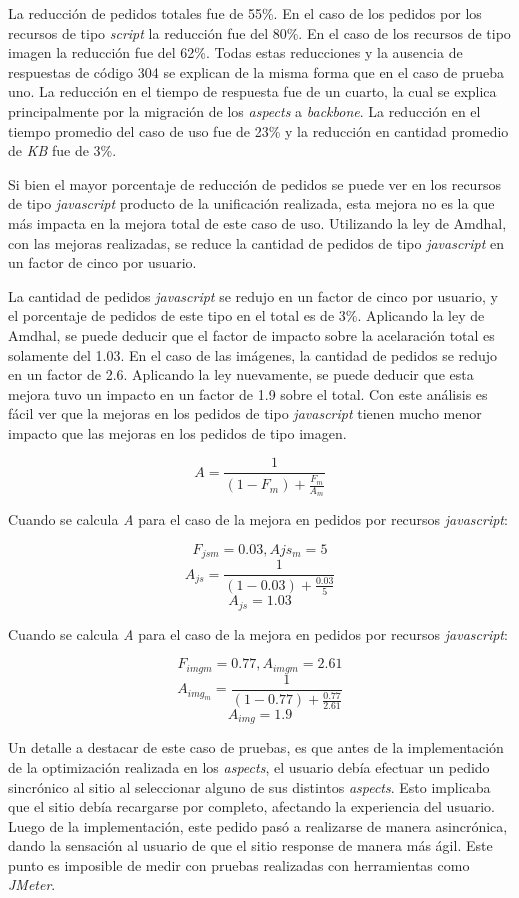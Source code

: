 La reducción de pedidos totales fue de 55\%. En el caso de los pedidos por los recursos de tipo
\emph{script} la reducción fue del 80\%. En el caso de los recursos de tipo imagen la reducción fue del 62\%. Todas estas reducciones
y la ausencia de respuestas de código 304 se explican de la misma forma que en el caso de prueba uno. La reducción en el tiempo de respuesta fue de un cuarto, la cual se explica 
principalmente por la migración de los \emph{aspects} a \emph{backbone}. La reducción en el tiempo promedio del caso de uso fue de 23\% y la reducción en cantidad promedio
de \emph{KB} fue de 3\%.

Si bien el mayor porcentaje de reducción de pedidos se puede ver en los recursos de tipo \emph{javascript} producto de la unificación realizada, esta mejora no es la que más
impacta en la mejora total de este caso de uso. Utilizando la ley de Amdhal, con las mejoras realizadas, se reduce la cantidad de pedidos de tipo \emph{javascript} en un factor
de cinco por usuario. 

La cantidad de pedidos \emph{javascript} se redujo en un factor de cinco por usuario, y el porcentaje de pedidos de este tipo en el total es de 3\%. Aplicando la ley
de Amdhal, se puede deducir que el factor de impacto sobre la acelaración total es solamente del 1.03. En el caso de las imágenes, la cantidad de pedidos se redujo en un factor de 
2.6. Aplicando la ley nuevamente, se puede deducir que esta mejora tuvo un impacto en un factor de 1.9 sobre el total. Con este análisis es fácil ver que la mejoras en los pedidos de 
tipo \emph{javascript} tienen mucho menor impacto que las mejoras en los pedidos de tipo imagen.

\[
	A = \frac{1}{(1 - F_m) + \frac{F_m}{A_m}}
\]
\cite{amdahl}

Cuando se calcula \emph{A} para el caso de la mejora en pedidos por recursos \emph{javascript}:

\[
	F_{jsm} = 0.03, Ajs_m = 5
\]
\[
	A_{js} = \frac{1}{(1 - 0.03) + \frac{0.03}{5}}
\]
\[	
	A_{js} = 1.03
\]

Cuando se calcula \emph{A} para el caso de la mejora en pedidos por recursos \emph{javascript}:

\[
	F_{imgm} = 0.77, A_{imgm} = 2.61
\]
\[
	A_{img_m} = \frac{1}{(1 - 0.77) + \frac{0.77}{2.61}}
\]
\[	
	A_{img} = 1.9
\]

Un detalle a destacar de este caso de pruebas, es que antes de la implementación de la optimización realizada en los \emph{aspects}, el usuario debía efectuar un pedido
sincrónico al sitio al seleccionar alguno de sus distintos \emph{aspects}. Esto implicaba que el sitio debía recargarse por completo, afectando la experiencia del usuario.
Luego de la implementación, este pedido pasó a realizarse de manera asincrónica, dando la sensación al usuario de que el sitio response de manera más ágil. Este punto es
imposible de medir con pruebas realizadas con herramientas como \emph{JMeter}.

